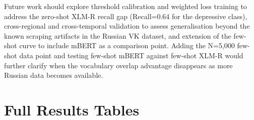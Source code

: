 \documentclass[12pt, a4paper, oneside]{report}
\begin{document}
Future work should explore threshold calibration and weighted loss training to address the zero-shot XLM-R recall gap (Recall=0.64 for the depressive class), cross-regional and cross-temporal validation to assess generalisation beyond the known scraping artifacts in the Russian VK dataset, and extension of the few-shot curve to include mBERT as a comparison point. Adding the N=5,000 few-shot data point and testing few-shot mBERT against few-shot XLM-R would further clarify when the vocabulary overlap advantage disappears as more Russian data becomes available.




\appendix
\chapter{Full Results Tables}
\label{app:results}
\end{document}
